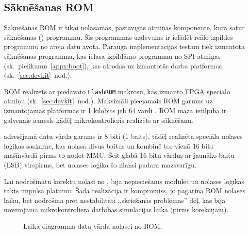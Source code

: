 \subsection{Sāknēšanas ROM} \label{sec:rom}
	Sāknēšanas ROM ir tikai nolasāmās, pastāvīgās atmiņas komponente, kura
	satur sāknēšanas () programmu.
	Šīs programmas uzdevums ir ielādēt reālo izpildes programmu no
	ārēja datu avota. Parauga implementācijas testam tiek izmantota
	sāknēšanas programma, kas ielasa izpildāmo programmu no SPI 
	atmiņas (sk.~pielikumu~\ref{appx:boot}), kas atrodas uz izmantotās
	darba platformas (sk.~\ref{sec:devkit}~nod.).
	
	ROM realizēts ar  piedāvāto
	\texttt{FlashROM} makrosu, kas izmanto  FPGA
	speciālo  atmiņu \cite{FlashROM} (sk.~\ref{sec:devkit}~nod.).
	Maksimāli pieejamais ROM garums uz izmantojamās platformas ir
	1 kilobits jeb 64 vārdi \cite[12.~lpp.]{FusionGuide}. ROM mazā ietilpība ir
	galvenais iemesls kādēļ mikrokontrolieris realizēts ar sāknēšanu.
	
	 adresējamā datu vārda garums ir 8 biti (1 baits),
	tādēļ realizēta speciāla nolases loģikas saskarne, kas nolasa divus
	baitus un kombinē tos vienā 16 bitu mašīnvārdā pirms to nodot MMU.
	Šeit  glabā 16 bitu vārdus ar jaunāko baitu (LSB) 
	virspirms, bet nolases loģika šo niansi padara mazsvarīgu.
	
	Lai nodrošinātu korektu nolasi no , bija nepieciešams
	modulēt  un nolases loģikas takts impulsa platumu.
	Šāda realizācija ir kompromiss, jo pagarina ROM nolases laiku, bet
	nodrošina pret nestabilitāti ,,skriešanās problēmas'' dēļ, kas bija
	novērojama mikrokontroliera darbības simulācijas laikā (pirms korekcijām).
	
	\begin{figure}[tbh]
		\centering
		\def\svgwidth{\textwidth}
		{\ttfamily\small}
		\caption{Laika diagramma datu vārda nolasei no ROM.}
		\label{fig:rom-time-diag}
	\end{figure}
	
